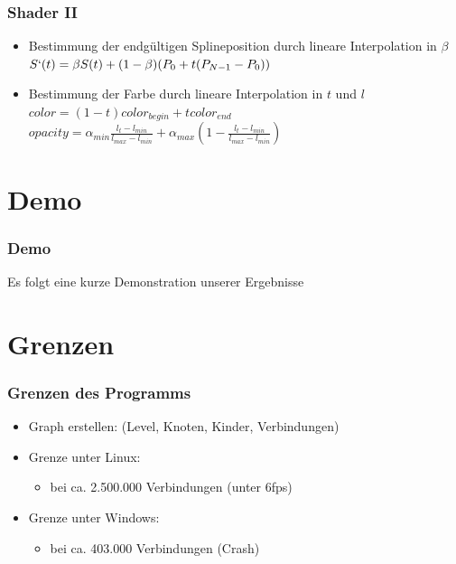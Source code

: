 \documentclass[11pt]{beamer}
\begin{document}
\begin{frame}
\frametitle{Shader II}
\begin{itemize}
\item Bestimmung der endgültigen Splineposition durch lineare Interpolation in $\beta$\\
$S`(t)=\beta S(t) + (1-\beta)(P_0 + t(P_{N-1} - P_0))$

\item Bestimmung der Farbe durch lineare Interpolation in $t$ und $l$
$color =(1-t) color_{begin} + t color_{end}$
$opacity = \alpha_{min} \frac{l_t-l_{min}}{l_{max}-l_{min}} + \alpha_{max} (1-\frac{l_t-l_{min}}{l_{max}-l_{min}})$
\end{itemize}
\end{frame}

\section{Demo}
\begin{frame}
\frametitle{Demo}

Es folgt eine kurze Demonstration unserer Ergebnisse

\end{frame}



\section{Grenzen}
\begin{frame}
\frametitle{Grenzen des Programms}

\begin{itemize}
\item Graph erstellen: (Level, Knoten, Kinder, Verbindungen)
\item Grenze unter Linux:
 \begin{itemize} 
 \item bei ca. 2.500.000 Verbindungen (unter 6fps)
 \end{itemize}
\item Grenze unter Windows:
	\begin{itemize}
	\item bei ca. 403.000 Verbindungen (Crash)
	\end {itemize}
\end{itemize}

\end{frame}
\end{document}
